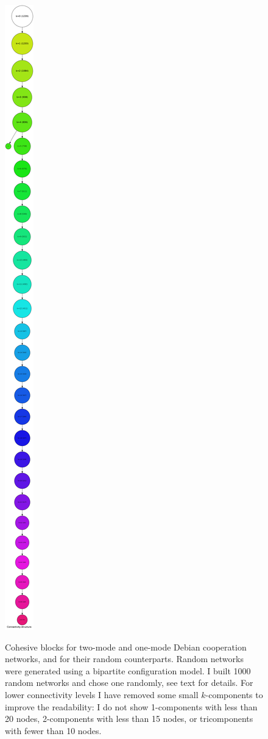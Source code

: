 \begin{landscape}
\begin{figure}[p]
{\includegraphics[scale=0.08]{figures/cohesive_blocks_lenny_1mode_random}
}
\caption[Cohesive blocks for two-mode and one-mode Debian networks.]{Cohesive blocks for two-mode and one-mode Debian cooperation networks, and for their random counterparts. Random networks were generated using a bipartite configuration model. I built 1000 random networks and chose one randomly, see text for details. For lower connectivity levels I have removed some small $k$-components to improve the readability: I do not show 1-components with less than 20 nodes, 2-components with less than 15 nodes, or tricomponents with fewer than 10 nodes.}
\label{fig:cb_lenny_all}
\end{figure}
\end{landscape}

